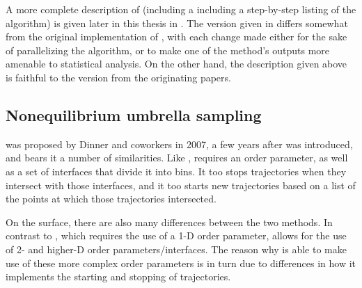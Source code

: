 
A more complete description of  (including a including a step-by-step listing of the algorithm) is given later in this thesis in . The version given in  differs somewhat from the original implementation of , with each change made either for the sake of parallelizing the algorithm, or to make one of the method's outputs more amenable to statistical analysis. On the other hand, the description given above is faithful to the version from the originating papers\supercite{Allen:2005wy,Allen:2006cp,Allen:2009kb}.

\subsection{Nonequilibrium umbrella sampling}
 was proposed by Dinner and coworkers\supercite{Warmflash:2007dz} in 2007, a few years after  was introduced, and bears it a number of similarities. Like ,  requires an order parameter, as well as a set of interfaces that divide it into bins. It too stops trajectories when they intersect with those interfaces, and it too starts new trajectories based on a list of the points at which those trajectories intersected.

On the surface, there are also many differences between the two methods. In contrast to , which requires the use of a 1-D order parameter,  allows for the use of 2- and higher-D order parameters/interfaces. The reason why  is able to make use of these more complex order parameters is in turn due to differences in how it implements the starting and stopping of trajectories. 

